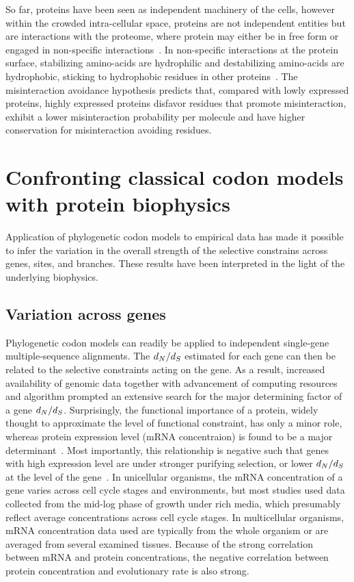 So far, proteins have been seen as independent machinery of the cells, however within the crowded intra-cellular space, proteins are not independent entities but are interactions with the proteome, where protein may either be in free form or engaged in non-specific interactions~\citep{Yang2012, Zhang2013}.
In non-specific interactions at the protein surface, stabilizing amino-acids are hydrophilic and destabilizing amino-acids are hydrophobic, sticking to hydrophobic residues in other proteins~\citep{Dixit2013,Manhart2015}.
The misinteraction avoidance hypothesis predicts that, compared with lowly expressed proteins, highly expressed proteins disfavor residues that promote misinteraction, exhibit a lower misinteraction probability per molecule and have higher conservation for misinteraction avoiding residues.

\section{Confronting classical codon models with protein biophysics}
\label{sec:classical-codon-biophysics}

Application of phylogenetic codon models to empirical data has made it possible to infer the variation in the overall strength of the selective constrains across genes, sites, and branches.
These results have been interpreted in the light of the underlying biophysics.

\subsection{Variation across genes}
\label{subsec:thermo-variation-across-genes}

Phylogenetic codon models can readily be applied to independent single-gene multiple-sequence alignments.
The $d_N / d_S$ estimated for each gene can then be related to the selective constraints acting on the gene.
As a result, increased availability of genomic data together with advancement of computing resources and algorithm prompted an extensive search for the major determining factor of a gene $d_N / d_S$.
Surprisingly, the functional importance of a protein, widely thought to approximate the level of functional constraint, has only a minor role, whereas protein expression level (mRNA concentraion) is found to be a major determinant~\citep{Zhang2015}.
Most importantly, this relationship is negative such that genes with high expression level are under stronger purifying selection, or lower $d_N / d_S$ at the level of the gene~\citep{Duret2000, Drummond2005a, Zhang2015}.
In unicellular organisms, the mRNA concentration of a gene varies across cell cycle stages and environments, but most studies used data collected from the mid-log phase of growth under rich media, which presumably reflect average concentrations across cell cycle stages.
In multicellular organisms, mRNA concentration data used are typically from the whole organism or are averaged from several examined tissues.
Because of the strong correlation between mRNA and protein concentrations, the negative correlation between protein concentration and evolutionary rate is also strong.


